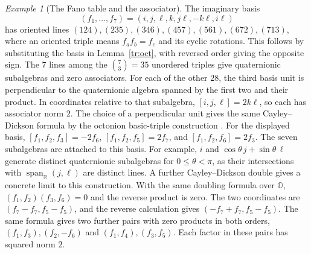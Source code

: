\documentclass[aps,pra,onecolumn,superscriptaddress,nofootinbib,10pt]{revtex4-2}
\theoremstyle{definition}
\theoremstyle{remark}
\newtheorem{example}[theorem]{Example}
\begin{document}
\begin{example}[The Fano table and the associator]\label{tr:fano}
The imaginary basis
\[
 (f_1,\ldots,f_7)=(i,j,\ell,k,j\ell,-k\ell,i\ell)
\]
has oriented lines
\((124),(235),(346),(457),(561),(672),(713)\), where an oriented
triple means \(f_a f_b=f_c\) and its cyclic rotations. This follows
by substituting the basis in Lemma~\ref{tr:oct}, with reversed order
giving the opposite sign. The \(7\) lines among the
\(\binom{7}{3}=35\) unordered triples give quaternionic subalgebras
and zero associators. For each of the other \(28\), the third basis
unit is perpendicular to the quaternionic algebra spanned by the
first two and their product. In coordinates relative to that
subalgebra, \([i,j,\ell]=2k\ell\), so each has associator norm \(2\).
The choice of a perpendicular unit gives the same Cayley--Dickson
formula by the octonion basic-triple construction \cite[\S4.1]{Baez}.
For the displayed basis,
\([f_1,f_2,f_3]=-2f_6\),
\([f_1,f_2,f_5]=2f_7\), and
\([f_1,f_2,f_6]=2f_3\).
The seven subalgebras are attached to this basis. For example,
\(i\) and \(\cos\theta\,j+\sin\theta\,\ell\) generate distinct
quaternionic subalgebras for \(0\leq\theta<\pi\), as their intersections
with \(\operatorname{span}_{\mathbb R}(j,\ell)\) are distinct lines.
A further Cayley--Dickson double gives a concrete limit to this
construction. With the same doubling formula over \(\mathbb O\),
\((f_1,f_2)(f_3,f_6)=0\) and the reverse product is zero.
The two coordinates are \((f_7-f_7,f_5-f_5)\), and the reverse
calculation gives \((-f_7+f_7,f_5-f_5)\).
The same formula gives two further pairs with zero products in both
orders, \((f_1,f_3),(f_2,-f_6)\) and \((f_1,f_4),(f_3,f_5)\).
Each factor in these pairs has squared norm \(2\).
\end{example}
\end{document}
